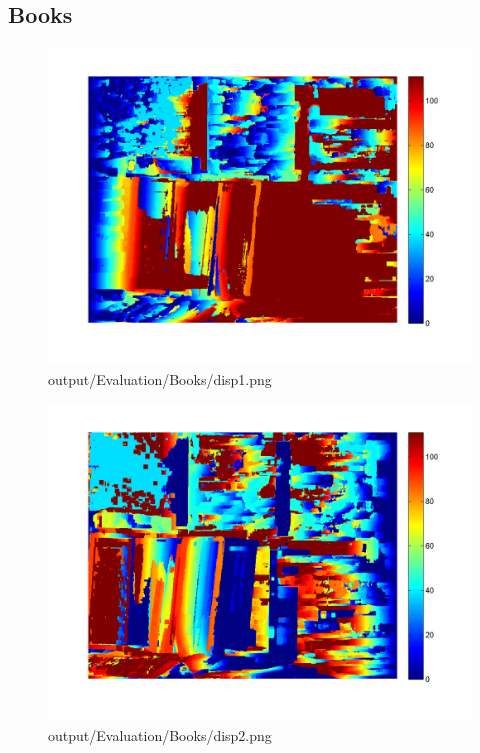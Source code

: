 \subsection{Books}
\begin{figure}[h]    \includegraphics[scale=0.5]{output/Evaluation/Books/disp1.png}    \caption{output/Evaluation/Books/disp1.png}\end{figure}
\begin{figure}[h]    \includegraphics[scale=0.5]{output/Evaluation/Books/disp2.png}    \caption{output/Evaluation/Books/disp2.png}\end{figure}
